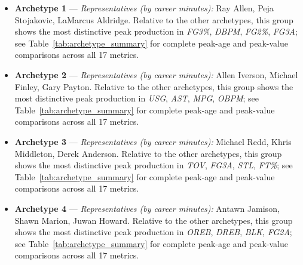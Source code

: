 \begin{itemize}
\item \textbf{Archetype 1} --- \emph{Representatives (by career minutes):} Ray Allen, Peja Stojakovic, LaMarcus Aldridge. Relative to the other archetypes, this group shows the most distinctive peak production in \textit{FG3\%}, \textit{DBPM}, \textit{FG2\%}, \textit{FG3A}; see Table~\ref{tab:archetype_summary} for complete peak-age and peak-value comparisons across all 17 metrics.
\item \textbf{Archetype 2} --- \emph{Representatives (by career minutes):} Allen Iverson, Michael Finley, Gary Payton. Relative to the other archetypes, this group shows the most distinctive peak production in \textit{USG}, \textit{AST}, \textit{MPG}, \textit{OBPM}; see Table~\ref{tab:archetype_summary} for complete peak-age and peak-value comparisons across all 17 metrics.
\item \textbf{Archetype 3} --- \emph{Representatives (by career minutes):} Michael Redd, Khris Middleton, Derek Anderson. Relative to the other archetypes, this group shows the most distinctive peak production in \textit{TOV}, \textit{FG3A}, \textit{STL}, \textit{FT\%}; see Table~\ref{tab:archetype_summary} for complete peak-age and peak-value comparisons across all 17 metrics.
\item \textbf{Archetype 4} --- \emph{Representatives (by career minutes):} Antawn Jamison, Shawn Marion, Juwan Howard. Relative to the other archetypes, this group shows the most distinctive peak production in \textit{OREB}, \textit{DREB}, \textit{BLK}, \textit{FG2A}; see Table~\ref{tab:archetype_summary} for complete peak-age and peak-value comparisons across all 17 metrics.
\end{itemize}
